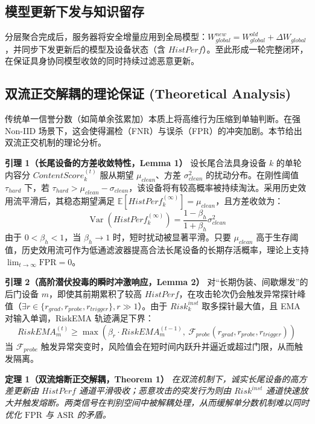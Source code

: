 \documentclass[11pt, a4paper, UTF8, fontset=fandol]{ctexart}
\begin{document}
\subsection{模型更新下发与知识留存}
分层聚合完成后，服务器将安全增量应用到全局模型：$W_{global}^{new} = W_{global}^{old} + \Delta W_{global}$，并同步下发更新后的模型及设备状态（含 $HistPerf$）。至此形成一轮完整闭环，在保证具身协同模型收敛的同时持续过滤恶意更新。

\subsection{双流正交解耦的理论保证 (Theoretical Analysis)}
传统单一信誉分数（如简单余弦累加）本质上将高维行为压缩到单轴判断。在强 Non-IID 场景下，这会使得漏检（FNR）与误杀（FPR）的冲突加剧。本节给出双流正交机制的理论分析。

\textbf{引理 1（长尾设备的方差收敛特性，Lemma 1）}
设长尾合法具身设备 $k$ 的单轮内容分 $ContentScore_{k}^{(t)}$ 服从期望 $\mu_{clean}$、方差 $\sigma_{clean}^2$ 的扰动分布。在刚性阈值 $\tau_{hard}$ 下，若 $\tau_{hard} > \mu_{clean} - \sigma_{clean}$，该设备将有较高概率被持续淘汰。采用历史效用流平滑后，其稳态期望满足 $\mathbb{E}[HistPerf_k^{(\infty)}] = \mu_{clean}$，且方差收敛为：
\begin{equation}
    \operatorname{Var}(HistPerf_{k}^{(\infty)}) = \frac{1-\beta_h}{1+\beta_h} \sigma_{clean}^{2}
\end{equation}
由于 $0 < \beta_h < 1$，当 $\beta_h \to 1$ 时，短时扰动被显著平滑。只要 $\mu_{clean}$ 高于生存阈值，历史效用流可作为低通滤波器提高合法长尾设备的长期存活概率，理论上支持 $\lim_{t \to \infty} \text{FPR} = 0$。

\textbf{引理 2（高阶潜伏投毒的瞬时冲激响应，Lemma 2）}
对“长期伪装、间歇爆发”的后门设备 $m$，即使其前期累积了较高 $HistPerf$，在攻击轮次仍会触发异常探针峰值（$\exists r \in \{r_{grad}, r_{probe}, r_{trigger}\}, r \gg 1$）。由于 $Risk_k^{inst}$ 取多探针最大值，且 EMA 对输入单调，RiskEMA 轨迹满足下界：
\begin{equation}
    RiskEMA_m^{(t)} \ge \max \left( \beta_r \cdot RiskEMA_m^{(t-1)},\ \mathcal{F}_{probe}(r_{grad}, r_{probe}, r_{trigger}) \right)
\end{equation}
当 $\mathcal{F}_{probe}$ 触发异常突变时，风险值会在短时间内跃升并逼近或超过门限，从而触发隔离。

\textbf{定理 1（双流熔断正交解耦，Theorem 1）}
\textit{在双流机制下，诚实长尾设备的高方差更新由 $HistPerf$ 通道平滑吸收；恶意攻击的突发行为则由 $Risk^{inst}$ 通道快速放大并触发熔断。两类信号在判别空间中被解耦处理，从而缓解单分数机制难以同时优化 $\text{FPR}$ 与 $\text{ASR}$ 的矛盾。}
\end{document}

